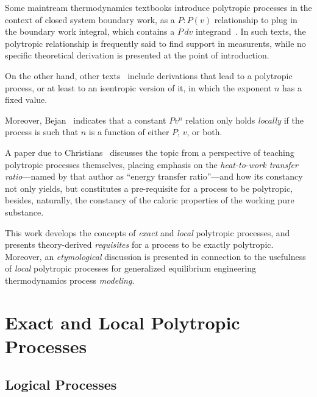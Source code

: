 \documentclass[fleqn,10pt]{SelfArx}
\begin{document}
    Some maintream thermodynamics textbooks introduce polytropic processes  in  the  context  of
    closed system boundary work, as a  $P:P(v)$  relationship  to  plug  in  the  boundary  work
    integral,   which    contains    a    $P\,dv$    integrand~\cite{2013-CengelYA+BolesMA-AMGH,
    2002-MoranMJ+ShapiroHN-LTC, 1985-WylenG-Wiley}. In such texts, the  polytropic  relationship
    is frequently said to find support in measurents, while no specific  theoretical  derivation
    is presented at the point of introduction.

    On  the  other  hand,  other  texts~\cite{1986-JonesJB+HawkinsGA-Wiley,   2006-BejanA-Wiley,
    2015-KroosKA+PotterMC-Cengage} include derivations that lead to a polytropic process, or  at
    least to an isentropic version of it, in which the exponent $n$ has a fixed value.

    Moreover, Bejan~\cite[p.~175]{2006-BejanA-Wiley} indicates that a constant  $Pv^n$  relation
    only holds \emph{locally} if the process is such that $n$ is a function of either $P$,  $v$,
    or both.

    A paper due to Christians~\cite{2012-ChristiansJ-IntJMechEngEduc} discusses the topic from a
    perspective  of  teaching  polytropic  processes  themselves,  placing   emphasis   on   the
    \emph{heat-to-work transfer ratio}---named by that author as ``energy transfer ratio''---and
    how its constancy not only yields, but constitutes a  pre-requisite  for  a  process  to  be
    polytropic, besides, naturally, the constancy of the caloric properties of the working  pure
    substance.

    This work develops the concepts of \emph{exact} and \emph{local} polytropic  processes,  and
    presents theory-derived \emph{requisites} for a process to be exactly polytropic.  Moreover,
    an  \emph{etymological}  discussion  is  presented  in  connection  to  the  usefulness   of
    \emph{local} polytropic processes for  generalized  equilibrium  engineering  thermodynamics
    process \emph{modeling}.

\section{Exact and Local Polytropic Processes}

    \subsection{Logical Processes}
\end{document}
